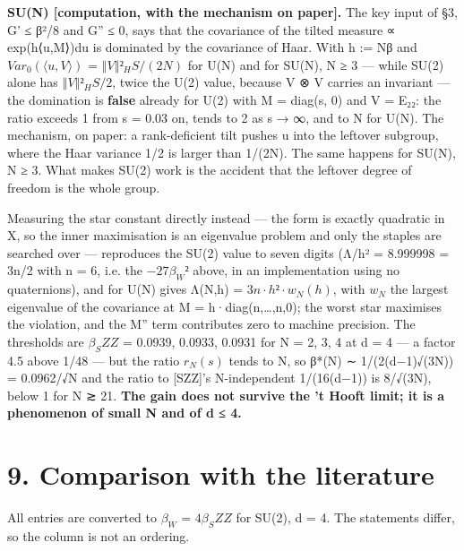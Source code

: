 \documentclass[11pt,a4paper]{article}
\theoremstyle{named}
\begin{document}
\textbf{SU(N) [computation, with the mechanism on paper].} The key input of §3, G' ≤ β²/8 and G'' ≤ 0, says that the covariance of the tilted measure ∝ exp(h⟨u,M⟩)du is dominated by the covariance of Haar. With h := Nβ and $Var_0(⟨u,V⟩)$ = $‖V‖²_HS/(2N)$ for U(N) and for SU(N), N ≥ 3 — while SU(2) alone has $‖V‖²_HS/2$, twice the U(2) value, because V ⊗ V carries an invariant — the domination is \textbf{false} already for U(2) with M = diag(s, 0) and V = E₂₂: the ratio exceeds 1 from s = 0.03 on, tends to 2 as s → ∞, and to N for U(N). The mechanism, on paper: a rank-deficient tilt pushes u into the leftover subgroup, where the Haar variance 1/2 is larger than 1/(2N). The same happens for SU(N), N ≥ 3. What makes SU(2) work is the accident that the leftover degree of freedom is the whole group.

Measuring the star constant directly instead — the form is exactly quadratic in X, so the inner maximisation is an eigenvalue problem and only the staples are searched over — reproduces the SU(2) value to seven digits (Λ/h² = 8.999998 = 3n/2 with n = 6, i.e. the $−27β_W²$ above, in an implementation using no quaternions), and for U(N) gives Λ(N,h) = $3n·h²·w_N(h)$, with $w_N$ the largest eigenvalue of the covariance at M = h·diag(n,…,n,0); the worst star maximises the violation, and the M'' term contributes zero to machine precision. The thresholds are $β_SZZ$ = 0.0939, 0.0933, 0.0931 for N = 2, 3, 4 at d = 4 — a factor 4.5 above 1/48 — but the ratio $r_N(s)$ tends to N, so β*(N) ∼ 1/(2(d−1)√(3N)) = 0.0962/√N and the ratio to [SZZ]'s N-independent 1/(16(d−1)) is 8/√(3N), below 1 for N ≳ 21. \textbf{The gain does not survive the 't Hooft limit; it is a phenomenon of small N and of d ≤ 4.}

\section*{9. Comparison with the literature}
All entries are converted to $β_W$ = $4β_SZZ$ for SU(2), d = 4. The statements differ, so the column is not an ordering.
\end{document}
